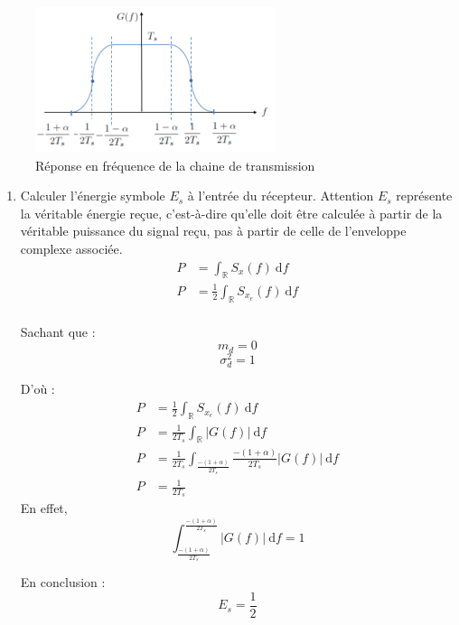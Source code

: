 \documentclass[frenchb]{article}
\begin{document}
\begin{figure}[h!]
\begin{center}
\includegraphics[width=7cm]{RCF.PNG}
\end{center}
\caption{Réponse en fréquence de la chaine de transmission} \label{rcf}
\end{figure}

\begin{enumerate}
    \item Calculer l'énergie symbole $E_s$ à l'entrée du récepteur. Attention $E_s$ représente la véritable énergie reçue, c'est-à-dire qu'elle doit être calculée à partir de la véritable puissance du signal reçu, pas à partir de celle de l'enveloppe complexe associée.
	\begin{equation*}
	\begin{split}
	P &= \int_\mathbb{R}S_x(f) \ \mathrm{d}f \\
	P &= \frac{1}{2} \int_\mathbb{R}S_{x_e}(f) \ \mathrm{d}f \\
    \end{split}
   \end{equation*}
   
   Sachant que : 
   $$ m_d = 0 $$
   $$ \sigma_d^2 = 1 $$
   
   D'où : 
   \begin{equation*}
	\begin{split}
	P &= \frac{1}{2} \int_\mathbb{R}S_{x_e}(f) \ \mathrm{d}f \\
	P & = \frac{1}{2T_s} \int_\mathbb{R}|G(f)| \ \mathrm{d}f \\
	P & = \frac{1}{2T_s} \int_{\frac{-(1+\alpha)}{2 T_s}}{\frac{-(1+\alpha)}{2 T_s}} |G(f)| \ \mathrm{d}f \\
	P & = \frac{1}{2T_s}
    \end{split}
   \end{equation*}
   En effet, 
   $$ \int_{\frac{-(1+\alpha)}{2 T_s}}^{\frac{-(1+\alpha)}{2 T_s}} |G(f)| \ \mathrm{d}f = 1 $$
   
   En conclusion : 
   $$\boxed{E_s = \frac{1}{2}}$$
        

\end{enumerate}
\end{document}
